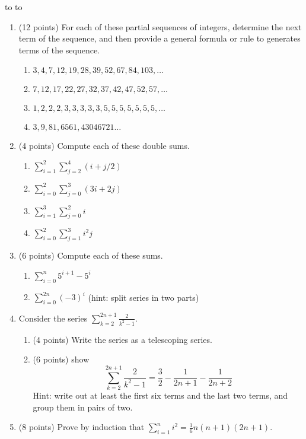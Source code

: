 \documentclass[10pt]{article}
\newcommand{\handout}{
   \renewcommand{\thepage}{H\hnumber-\arabic{page}}
   \noindent
   \begin{center}
      \vbox{
    \hbox to \columnwidth {\sc{\course} --- \prof \hfill}
    \vspace{-2mm}
    \hbox to \columnwidth {\sc due \MakeLowercase{\duedate} \duelocation\hfill {\Huge\color{mdb}H\hnumber.}}
	\vspace{15pt}
	{\Huge\yourname}
      }
   \end{center}
   \vspace*{2mm}
}
\begin{document}
\thispagestyle{empty}
\handout

\begin{enumerate}

\item (12 points)
For each of these partial sequences of integers, determine the next term of 
the sequence, and then provide a general formula or rule to generates terms of the
sequence.
\begin{enumerate}
\item $3, 4, 7, 12, 19, 28, 39, 52, 67, 84, 103, \ldots$
\item $7, 12, 17, 22, 27, 32, 37, 42, 47, 52, 57, \ldots$
\item $1, 2, 2, 2, 3, 3, 3, 3, 3, 5, 5, 5, 5, 5, 5, 5, \ldots$
\item $3, 9, 81, 6561, 43046721 \ldots$
\end{enumerate}

\item(4 points) Compute each of these double sums.
\begin{enumerate}
\item $\sum_{i=1}^2\sum_{j=2}^4(i+j/2)$
\item $\sum_{i=0}^2\sum_{j=0}^3(3i+2j)$
\item $\sum_{i=1}^3\sum_{j=0}^2 i$
\item $\sum_{i=0}^2\sum_{j=1}^3 i^2j$
\end{enumerate}

\item(6 points) Compute each of these sums.
\begin{enumerate}
\item $\sum_{i=0}^n 5^{i+1}-5^i$
\item $\sum_{i=0}^{2n} (-3)^i$  (hint: split series in two parts)
\end{enumerate}

\item Consider the series $\sum_{k=2}^{2n+1}\frac{2}{k^2-1}.$
\begin{enumerate}
\item (4 points) Write the series as a telescoping series.
\item (6 points) show 
$$\sum_{k=2}^{2n+1}\frac{2}{k^2-1}= \frac{3}{2}-\frac{1}{2n+1}-\frac{1}{2n+2}$$
Hint: write out at least the first six terms and the last two terms, and group them in pairs of two.
\end{enumerate}

\item (8 points) Prove by induction that $\sum_{i=1}^ni^2=\frac{1}{6}n(n+1)(2n+1)$.
 
\end{enumerate}
\end{document}
